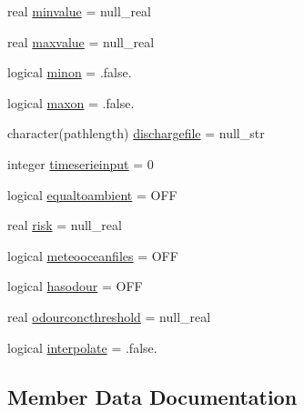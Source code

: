 \begin{DoxyCompactItemize}
\item 
real \mbox{\hyperlink{structmodulelagrangianglobal_1_1t__property_a034524b78db79d0a7122c06524cb8f99}{minvalue}} = null\+\_\+real
\item 
real \mbox{\hyperlink{structmodulelagrangianglobal_1_1t__property_ad0400eedbc1b12b7ad0bd9af7aa4edfc}{maxvalue}} = null\+\_\+real
\item 
logical \mbox{\hyperlink{structmodulelagrangianglobal_1_1t__property_a5db31e3230af1f231adcdae127e2a3b0}{minon}} = .false.
\item 
logical \mbox{\hyperlink{structmodulelagrangianglobal_1_1t__property_af68cd93cf54a830164ced91642656acc}{maxon}} = .false.
\item 
character(pathlength) \mbox{\hyperlink{structmodulelagrangianglobal_1_1t__property_ac3c85c9700ed0bf28581a0c165b02e32}{dischargefile}} = null\+\_\+str
\item 
integer \mbox{\hyperlink{structmodulelagrangianglobal_1_1t__property_a2126942f429300736ae092f24664a1c0}{timeserieinput}} = 0
\item 
logical \mbox{\hyperlink{structmodulelagrangianglobal_1_1t__property_a2fede235067cdf9155dc95ca37c3f3ab}{equaltoambient}} = O\+FF
\item 
real \mbox{\hyperlink{structmodulelagrangianglobal_1_1t__property_a75de9de0f69bdb8abe38a048d7c061f4}{risk}} = null\+\_\+real
\item 
logical \mbox{\hyperlink{structmodulelagrangianglobal_1_1t__property_a697636aba21cd651d5d3daae994ba677}{meteooceanfiles}} = O\+FF
\item 
logical \mbox{\hyperlink{structmodulelagrangianglobal_1_1t__property_a88af8f7be8370a8540b2e9afd019cea5}{hasodour}} = O\+FF
\item 
real \mbox{\hyperlink{structmodulelagrangianglobal_1_1t__property_acfe52aaf4f554120ba4d6b1f6fc15aa2}{odourconcthreshold}} = null\+\_\+real
\item 
logical \mbox{\hyperlink{structmodulelagrangianglobal_1_1t__property_a02794b327b1f87df1ba8846c5df8ce87}{interpolate}} = .false.
\end{DoxyCompactItemize}


\subsection{Member Data Documentation}
\mbox{\label{structmodulelagrangianglobal_1_1t__property_a2810047789954151510b4a22f91082f6}} 
